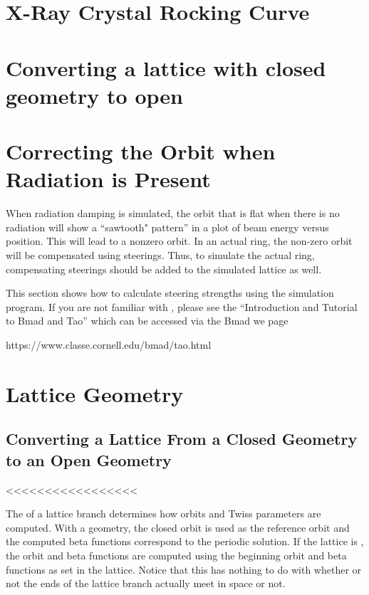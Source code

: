 \documentclass{hitec}     %
\newcommand{\Section}[1]{\section{#1}\vspace*{-1ex}}
\begin{document}
\Section{X-Ray Crystal Rocking Curve}




\Section{Converting a lattice with closed geometry to open}



\Section{Correcting the Orbit when Radiation is Present}

When radiation damping is simulated, the orbit that is flat when there is no radiation will show a
``sawtooth" pattern'' in a plot of beam energy versus position. This will lead to a nonzero
orbit. In an actual ring, the non-zero orbit will be compensated using steerings. Thus, to
simulate the actual ring, compensating steerings should be added to the simulated lattice as well.

This section
shows how to calculate steering strengths using the  simulation program.  If you are not
familiar with , please see the ``Introduction and Tutorial to Bmad and Tao'' which can be
accessed via the Bmad we page
\begin{code}
  https://www.classe.cornell.edu/bmad/tao.html
\end{code}




\Section{Lattice Geometry}
\label{s:geometry}

\subsection{Converting a Lattice From a Closed Geometry to an Open Geometry}
\label{s:openit}



<<<<<<<<<<<<<<<<<

The  of a lattice branch determines how orbits and Twiss parameters are computed. With
a  geometry, the closed orbit is used as the reference orbit and the computed beta
functions correspond to the periodic solution. If the lattice is , the orbit and beta
functions are computed using the beginning orbit and beta functions as set in the lattice. Notice
that this has nothing to do with whether or not the ends of the lattice branch actually meet in
space or not.
\end{document}
